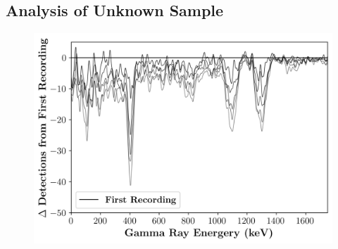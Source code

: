 \documentclass[a4paper,twocolumn]{IEEEtran}
\begin{document}
    \subsection{Analysis of Unknown Sample}
    \begin{figure}[H]
        \centering
        \includegraphics[width=0.95\linewidth]{figures/difference_counts_smooth.png}
    \end{figure}
\end{document}
